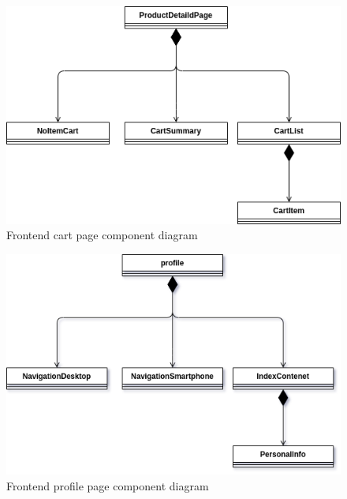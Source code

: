 \begin{figure}[!ht]
  \caption{ Frontend cart page component diagram}
  \vspace{10px}
  \includegraphics[scale=0.39]{../../../../Images/Diagrammi/maintainerManual/FE/CartDiagram.png}
  \centering
\end{figure}
\begin{figure}[!ht]
  \caption{ Frontend profile page component diagram}
  \vspace{10px}
  \includegraphics[scale=0.39]{../../../../Images/Diagrammi/maintainerManual/FE/ProfileDiagram.png}
  \centering
\end{figure}
